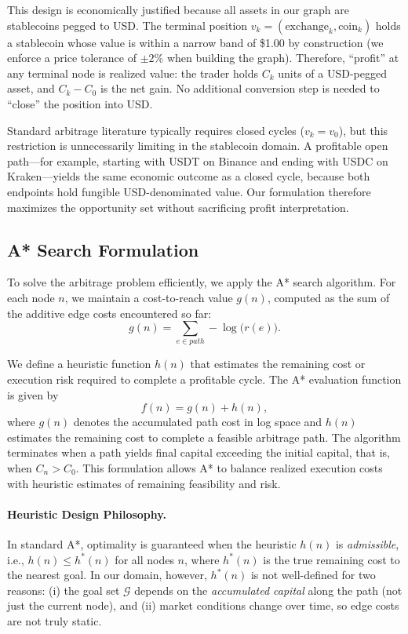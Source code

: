 This design is economically justified because all assets in our graph are stablecoins pegged to USD. The terminal position $v_k = (\text{exchange}_k, \text{coin}_k)$ holds a stablecoin whose value is within a narrow band of \$1.00 by construction (we enforce a price tolerance of $\pm 2\%$ when building the graph). Therefore, ``profit'' at any terminal node is realized value: the trader holds $C_k$ units of a USD-pegged asset, and $C_k - C_0$ is the net gain. No additional conversion step is needed to ``close'' the position into USD.

Standard arbitrage literature typically requires closed cycles ($v_k = v_0$), but this restriction is unnecessarily limiting in the stablecoin domain. A profitable open path—for example, starting with USDT on Binance and ending with USDC on Kraken—yields the same economic outcome as a closed cycle, because both endpoints hold fungible USD-denominated value. Our formulation therefore maximizes the opportunity set without sacrificing profit interpretation.

\subsection{A* Search Formulation}

To solve the arbitrage problem efficiently, we apply the A* search algorithm. For each node $n$, we maintain a cost-to-reach value $g(n)$, computed as the sum of the additive edge costs encountered so far:
\[
g(n) = \sum_{e\in path} -\log\!\big(r(e)\big).
\]

We define a heuristic function $h(n)$ that estimates the remaining cost or execution risk required to complete a profitable cycle. The A* evaluation function is given by
\[
f(n) = g(n) + h(n),
\]
where $g(n)$ denotes the accumulated path cost in log space and $h(n)$ estimates the remaining cost to complete a feasible arbitrage path. The algorithm terminates when a path yields final capital exceeding the initial capital, that is, when $C_n > C_0$. This formulation allows A* to balance realized execution costs with heuristic estimates of remaining feasibility and risk.

\paragraph{Heuristic Design Philosophy.}
In standard A*, optimality is guaranteed when the heuristic $h(n)$ is \emph{admissible}, i.e., $h(n) \leq h^*(n)$ for all nodes $n$, where $h^*(n)$ is the true remaining cost to the nearest goal. In our domain, however, $h^*(n)$ is not well-defined for two reasons: (i) the goal set $\mathcal{G}$ depends on the \emph{accumulated capital} along the path (not just the current node), and (ii) market conditions change over time, so edge costs are not truly static.

